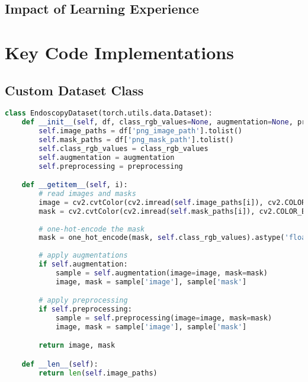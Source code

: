 \documentclass[12pt,a4paper]{report}
\begin{document}
\section{Impact of Learning Experience}




\appendix

\chapter{Key Code Implementations}

\section{Custom Dataset Class}
\begin{lstlisting}[language=Python, caption=EndoscopyDataset Implementation]
class EndoscopyDataset(torch.utils.data.Dataset):
    def __init__(self, df, class_rgb_values=None, augmentation=None, preprocessing=None):
        self.image_paths = df['png_image_path'].tolist()
        self.mask_paths = df['png_mask_path'].tolist()
        self.class_rgb_values = class_rgb_values
        self.augmentation = augmentation
        self.preprocessing = preprocessing

    def __getitem__(self, i):
        # read images and masks
        image = cv2.cvtColor(cv2.imread(self.image_paths[i]), cv2.COLOR_BGR2RGB)
        mask = cv2.cvtColor(cv2.imread(self.mask_paths[i]), cv2.COLOR_BGR2RGB)
        
        # one-hot-encode the mask
        mask = one_hot_encode(mask, self.class_rgb_values).astype('float')
        
        # apply augmentations
        if self.augmentation:
            sample = self.augmentation(image=image, mask=mask)
            image, mask = sample['image'], sample['mask']

        # apply preprocessing
        if self.preprocessing:
            sample = self.preprocessing(image=image, mask=mask)
            image, mask = sample['image'], sample['mask']

        return image, mask

    def __len__(self):
        return len(self.image_paths)
\end{lstlisting}
\end{document}
